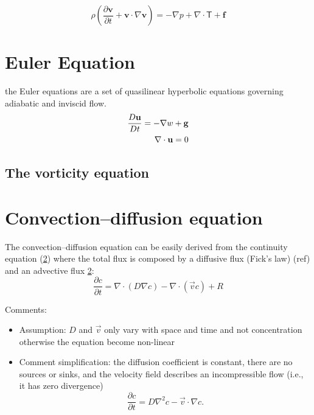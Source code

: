 \documentclass[twocolumn]{article}
\numberwithin{equation}{section}
\begin{document}
\[ \rho \left(\frac{\partial \mathbf{v}}{\partial t} + \mathbf{v} \cdot \nabla \mathbf{v} \right) = -\nabla p + \nabla \cdot\boldsymbol{\mathsf{T}} + \mathbf{f} \]




		
		
	\section{Euler Equation}
the Euler equations are a set of quasilinear hyperbolic equations governing adiabatic and inviscid flow. 
\begin{align*} 
{D\bold u \over Dt} = - \nabla w +\bold{g} \\
\nabla\cdot \bold u=0
\end{align*}
		\subsection{The vorticity equation}
		
	\section{Convection–diffusion equation}
The convection–diffusion equation can be easily derived from the continuity equation (\ref{}) where the total flux is composed by a diffusive flux (Fick's law) (ref{}) and an advective flux \ref{}:
$$\frac{\partial c}{\partial t}  = \nabla \cdot (D \nabla c) - \nabla \cdot (\vec{v} c) + R$$

Comments:
\begin{itemize}
	\item Assumption: $D$ and $\vec{v}$ only vary with space and time and not concentration otherwise the equation become non-linear
	\item Comment simplification:  the diffusion coefficient is constant, there are no sources or sinks, and the velocity field describes an incompressible flow (i.e., it has zero divergence)
	$$\frac{\partial c}{\partial t}  = D \nabla^2 c - \vec{v} \cdot \nabla c. $$
\end{itemize}








	
	
\end{document}
